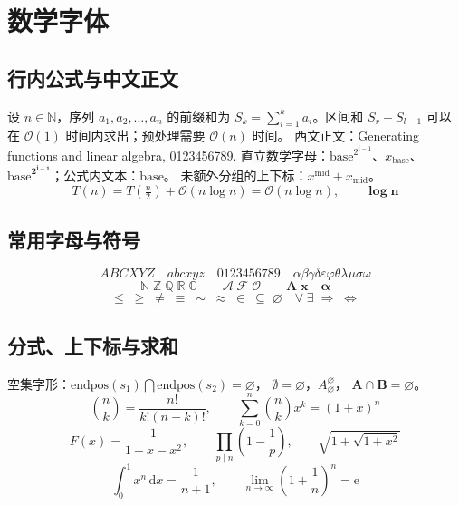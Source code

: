 \documentclass{article}
\begin{document}
\section{数学字体}
\subsection{行内公式与中文正文}
设 $n\in\mathbb{N}$，序列 $a_1,a_2,\ldots,a_n$ 的前缀和为
$S_k=\sum_{i=1}^{k}a_i$。区间和 $S_r-S_{l-1}$ 可以在
$\mathcal{O}(1)$ 时间内求出；预处理需要 $\mathcal{O}(n)$ 时间。
西文正文：Generating functions and linear algebra, 0123456789.
直立数学字母：$\mathrm{base}^{2^{i-1}}$、$x_{\mathrm{base}}$、
$\boldsymbol{\mathrm{base}^{2^{i-1}}}$；公式内文本：$\text{base}$。
未额外分组的上下标：$x^\mathrm{mid}+x_\mathrm{mid}$。
\[
  T(n)=T(\tfrac{n}{2})+\mathcal{O}(n\log n)=\mathcal{O}(n\log n),
  \qquad \boldsymbol{\log n}
\]

\subsection{常用字母与符号}
\[
  ABCXYZ\quad abcxyz\quad 0123456789\quad
  \alpha\beta\gamma\delta\varepsilon\varphi\theta\lambda\mu\sigma\omega
\]
\[
  \mathbb{N}\;\mathbb{Z}\;\mathbb{Q}\;\mathbb{R}\;\mathbb{C}
  \qquad \mathcal{A}\;\mathcal{F}\;\mathcal{O}
  \qquad \mathbf{A}\;\mathbf{x}\quad \boldsymbol{\alpha}
\]
\[
  \leq\;\geq\;\neq\;\equiv\;\sim\;\approx\;\in\;\subseteq\;\varnothing
  \quad \forall\;\exists\;\Rightarrow\;\Longleftrightarrow
\]

\subsection{分式、上下标与求和}
空集字形：$\mathrm{endpos}(s_1)\bigcap\mathrm{endpos}(s_2)=\varnothing$，
$\emptyset=\varnothing$，$A_{\varnothing}^{\varnothing}$，
$\boldsymbol{A\cap B=\varnothing}$。
\[
  \binom{n}{k}=\frac{n!}{k!(n-k)!},\qquad
  \sum_{k=0}^{n}\binom{n}{k}x^k=(1+x)^n
\]
\[
  F(x)=\frac{1}{1-x-x^2},\qquad
  \prod_{p\mid n}\left(1-\frac{1}{p}\right),\qquad
  \sqrt{1+\sqrt{1+x^2}}
\]
\[
  \int_0^1 x^n\,\mathrm{d}x=\frac{1}{n+1},\qquad
  \lim_{n\to\infty}\left(1+\frac{1}{n}\right)^n=\mathrm{e}
\]
\end{document}
